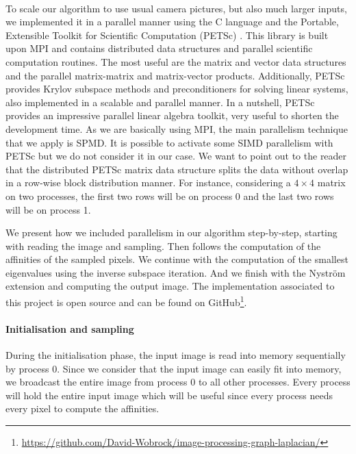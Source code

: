 \paragraph{}
To scale our algorithm to use usual camera pictures, but also much larger inputs, we implemented it in a parallel manner using the C language and the Portable, Extensible Toolkit for Scientific Computation (PETSc) \cite{petsc_web_page}.
This library is built upon MPI and contains distributed data structures and parallel scientific computation routines.
The most useful are the matrix and vector data structures and the parallel matrix-matrix and matrix-vector products.
Additionally, PETSc provides Krylov subspace methods and preconditioners for solving linear systems, also implemented in a scalable and parallel manner.
In a nutshell, PETSc provides an impressive parallel linear algebra toolkit, very useful to shorten the development time.
As we are basically using MPI, the main parallelism technique that we apply is SPMD.
It is possible to activate some SIMD parallelism with PETSc but we do not consider it in our case.
We want to point out to the reader that the distributed PETSc matrix data structure splits the data without overlap in a row-wise block distribution manner.
For instance, considering a \(4 \times 4\) matrix on two processes, the first two rows will be on process 0 and the last two rows will be on process 1.

We present how we included parallelism in our algorithm step-by-step, starting with reading the image and sampling.
Then follows the computation of the affinities of the sampled pixels.
We continue with the computation of the smallest eigenvalues using the inverse subspace iteration.
And we finish with the Nystr\"om extension and computing the output image.
The implementation associated to this project is open source and can be found on GitHub\footnote{\url{https://github.com/David-Wobrock/image-processing-graph-laplacian/}}.

\paragraph{Initialisation and sampling}
During the initialisation phase, the input image is read into memory sequentially by process 0.
Since we consider that the input image can easily fit into memory, we broadcast the entire image from process 0 to all other processes.
Every process will hold the entire input image which will be useful since every process needs every pixel to compute the affinities.

